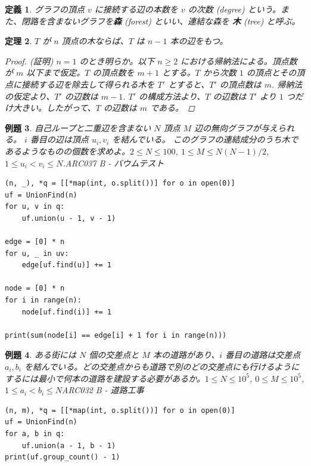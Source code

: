\documentclass[12pt, a4j]{ltjsarticle}
\newtheorem{thm}{定理}
\newtheorem{defi}[thm]{定義}
\newtheorem{exm}[thm]{例題}
\newcommand*{\SS}{\vspace{1cm}}
\begin{document}
\begin{defi}
グラフの頂点 $v$ に接続する辺の本数を $v$ の次数 (degree) という。また、閉路を含まないグラフを{\bf 森} (forest) といい、連結な森を {\bf 木} (tree) と呼ぶ。
\end{defi}

\SS

\begin{thm}
$T$ が $n$ 頂点の木ならば、$T$ は $n − 1$ 本の辺をもつ。
\begin{proof} (証明) $n=1$ のとき明らか。以下 $n\ge 2$ における帰納法による。頂点数が $m$
以下まで仮定。$T$ の頂点数を $m + 1$ とする。$T$ から次数 $1$ の頂点とその頂点に接続する辺を除去して得られる木を $T'$ とすると、$T'$ の頂点数は $m$. 帰納法の仮定より、$T'$ の辺数は $m − 1$. $T'$ の構成方法より、$T$ の辺数は $T'$ より $1$ つだけ大きい。したがって、$T$ の辺数は $m$ である。

\end{proof}
\end{thm}
\begin{exm}
自己ループと二重辺を含まない $N$ 頂点 $M$ 辺の無向グラフが与えられる。 $i$ 番目の辺は頂点 $u_i,v_i$ を結んでいる。 このグラフの連結成分のうち木であるようなものの個数を求めよ。$2\le N \le 100$, $1\le M \le N(N-1)/2$, $1\le u_i < v_i \le N$.\quad\upshape ARC037 B - バウムテスト\\
\begin{lstlisting}
(n, _), *q = [[*map(int, o.split())] for o in open(0)]
uf = UnionFind(n)
for u, v in q:
    uf.union(u - 1, v - 1)

edge = [0] * n
for u, _ in uv:
    edge[uf.find(u)] += 1

node = [0] * n
for i in range(n):
    node[uf.find(i)] += 1

print(sum(node[i] == edge[i] + 1 for i in range(n)))
\end{lstlisting}
\end{exm}

\newpage

\begin{exm} ある街には $N$ 個の交差点と $M$ 本の道路があり、$i$ 番目の道路は交差点 $a_i,b_i$ を結んでいる。どの交差点からも道路で別のどの交差点にも行けるようにするには最小で何本の道路を建設する必要があるか。$1 \le N \le 10^5$, $0 \le M \le 10^5$, $1 \le a_i < b_i \le N$\upshape\quad ARC032 B - 道路工事\\
\begin{lstlisting}[frame = none]
(n, m), *q = [[*map(int, o.split())] for o in open(0)]
uf = UnionFind(n)
for a, b in q:
    uf.union(a - 1, b - 1)
print(uf.group_count() - 1)
\end{lstlisting}
\end{exm}
\end{document}
